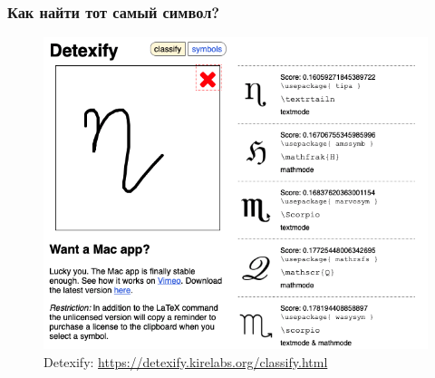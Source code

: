 \begin{frame}

\frametitle{Как найти тот самый символ?}

\begin{figure}
    \centering
    \includegraphics[scale=0.3]{images/detexify.png}
    \\
        Detexify: {\color{blue} \url{https://detexify.kirelabs.org/classify.html}}
\end{figure}

\end{frame}

